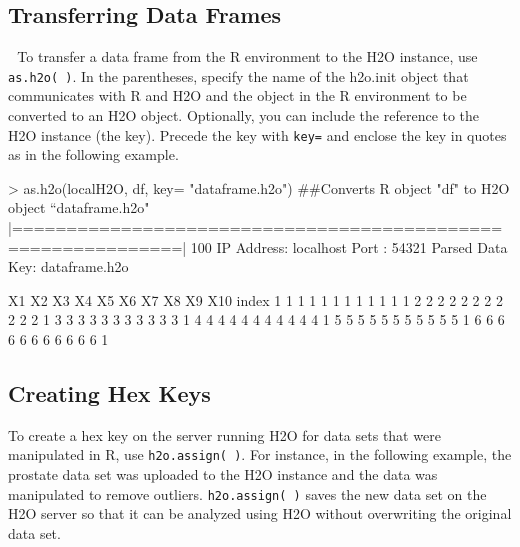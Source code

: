 \documentclass[11pt]{article}
\begin{document}
\subsection{Transferring Data Frames} 
To transfer a data frame from the R environment to the H2O instance, use  {\texttt{as.h2o( )}}. In the parentheses, specify the name of the h2o.init object that communicates with R and H2O and the object in the R environment to be converted to an H2O object. Optionally, you can include the reference to the H2O instance (the key). Precede the key with {\texttt{key=}} and enclose the key in quotes as in the following example. 

\begin{spverbatim}
> as.h2o(localH2O, df, key= "dataframe.h2o")
##Converts R object "df" to H2O object “dataframe.h2o"
  |=============================================================| 100%
IP Address: localhost 
Port      : 54321 
Parsed Data Key: dataframe.h2o 

  X1 X2 X3 X4 X5 X6 X7 X8 X9 X10 index
1  1  1  1  1  1  1  1  1  1   1     1
2  2  2  2  2  2  2  2  2  2   2     1
3  3  3  3  3  3  3  3  3  3   3     1
4  4  4  4  4  4  4  4  4  4   4     1
5  5  5  5  5  5  5  5  5  5   5     1
6  6  6  6  6  6  6  6  6  6   6     1
\end{spverbatim}


\subsection{Creating Hex Keys}

To create a hex key on the server running H2O for data sets that were manipulated in R, use {\texttt{h2o.assign( )}}. For instance, in the following example, the prostate data set was uploaded to the H2O instance and the data was manipulated to remove outliers. {\texttt{h2o.assign( )}} saves the new data set on the H2O server so that it can be analyzed using H2O without overwriting the original data set.  

\end{document}
